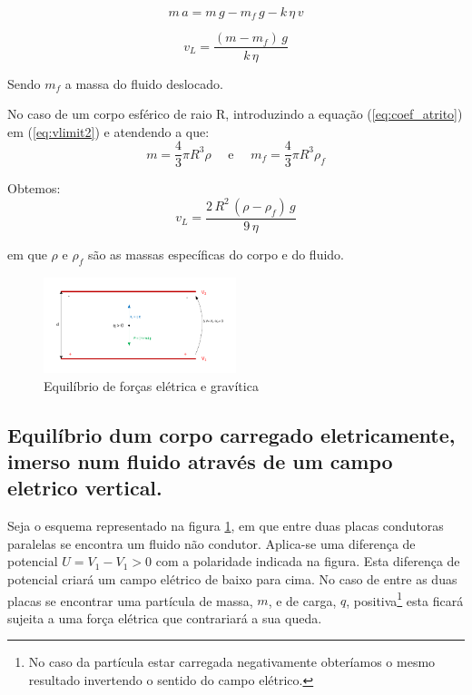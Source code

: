 \documentclass[a4paper,twoside,12pt]{article}      %
\begin{document}
\begin{equation}
	\label{eq:mov2}
	m\,a = m\,g - m_f\,g  - k  \, \eta \, v
\end{equation}


\begin{equation}
	\label{eq:vlimit2}
	v_L = \frac{(m - m_f)\,g}{k  \, \eta}
\end{equation}

Sendo $m_f$ a massa do fluido deslocado.

No caso de um corpo esférico de raio R, introduzindo a equação (\ref{eq:coef_atrito}) em (\ref{eq:vlimit2}) e atendendo a que:
\begin{equation*}
	m = \frac{4}{3} \pi R^3 \rho \quad \textrm{  e } \quad  m_f = \frac{4}{3} \pi R^3 \rho_f
\end{equation*}

Obtemos:
\begin{equation}
	\label{eq:vlimit3}
	v_L = \frac{2\,R^2\, (\rho - \rho_f)\,g}{9  \, \eta}
\end{equation}

em que $\rho$  e $\rho_f$ são as massas específicas do corpo e do fluido.

%


\begin{figure}
	[tb]  \centering 
	\includegraphics[width=0.5\textwidth]{./F_equil}
	\caption{Equilíbrio de forças elétrica e gravítica \label{fig:f_equil}} 
\end{figure}


\subsection{\sf Equilíbrio dum corpo carregado eletricamente, imerso num fluido através de um campo eletrico vertical.}

Seja o esquema representado na figura \ref{fig:f_equil}, em que entre duas placas condutoras paralelas se encontra um fluido não condutor. Aplica-se uma diferença de potencial $U = V_1 -V_1 > 0$ com a polaridade indicada na figura. Esta diferença de potencial criará um campo elétrico de baixo para cima. No caso de entre as duas placas se encontrar uma partícula de massa, $m$, e de carga, $q$, positiva\footnote{No caso da partícula estar carregada negativamente obteríamos o mesmo resultado invertendo o sentido do campo elétrico.} esta ficará sujeita a uma força elétrica que contrariará a sua queda.
\end{document}
